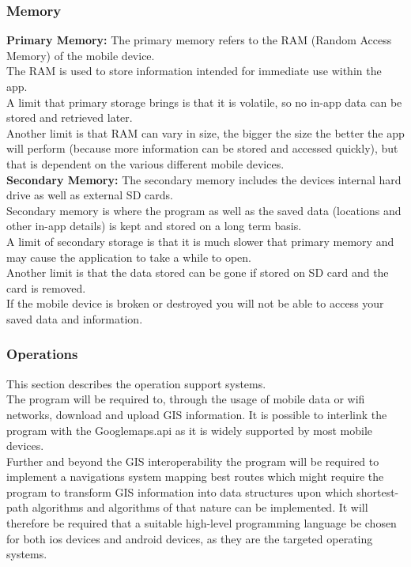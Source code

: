 \documentclass[12pt]{article}
\begin{document}
		\subsubsection{Memory}
		\textbf{Primary Memory:}
		The primary memory refers to the RAM (Random Access Memory) of the mobile device.\\
		The RAM is used to store information intended for immediate use within the app.\\
		A limit that primary storage brings is that it is volatile, so no in-app data can be stored and retrieved later.\\
		Another limit is that RAM can vary in size, the bigger the size the better the app will perform (because more information can be stored and accessed quickly), but that is dependent on the various different mobile devices.\\
		\textbf{Secondary Memory:}
		The secondary memory includes the devices internal hard drive as well as external SD cards.\\
		Secondary memory is where the program as well as the saved data (locations and other in-app details) is kept and stored on a long term basis. \\
		A limit of secondary storage is that it is much slower that primary memory and may cause the application to take a while to open.\\
		Another limit is that the data stored can be gone if stored on SD card and the card is removed.\\
		If the mobile device is broken or destroyed you will not be able to access your saved data and information.\\
		
		\subsubsection{Operations}
		This section describes the operation support systems.\\
		The program will be required to, through the usage of mobile data or wifi networks, download and upload GIS information. It is possible to interlink the program with the Googlemaps.api as it is widely supported by most mobile devices.\\
		Further and beyond the GIS interoperability the program will be required to implement a navigations system mapping best routes which might require the program to transform GIS information into data structures upon which shortest-path algorithms and algorithms of that nature can be implemented. It will therefore be required that a suitable high-level programming language be chosen for both ios devices and android devices, as they are the targeted operating systems.\\
		
\end{document}
